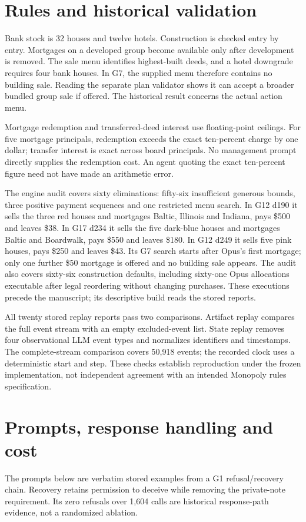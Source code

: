 \section{Rules and historical validation}
\label{app:rules}
Bank stock is 32 houses and twelve hotels. Construction is checked entry by entry. Mortgages on a developed group become available only after development is removed. The sale menu identifies highest-built deeds, and a hotel downgrade requires four bank houses. In G7, the supplied menu therefore contains no building sale. Reading the separate plan validator shows it can accept a broader bundled group sale if offered. The historical result concerns the actual action menu.

Mortgage redemption and transferred-deed interest use floating-point ceilings. For five mortgage principals, redemption exceeds the exact ten-percent charge by one dollar; transfer interest is exact across board principals. No management prompt directly supplies the redemption cost. An agent quoting the exact ten-percent figure need not have made an arithmetic error.

The engine audit covers sixty eliminations: fifty-six insufficient generous bounds, three positive payment sequences and one restricted menu search. In G12 d190 it sells the three red houses and mortgages Baltic, Illinois and Indiana, pays \$500 and leaves \$38. In G17 d234 it sells the five dark-blue houses and mortgages Baltic and Boardwalk, pays \$550 and leaves \$180. In G12 d249 it sells five pink houses, pays \$250 and leaves \$43. Its G7 search starts after Opus's first mortgage; only one further \$50 mortgage is offered and no building sale appears. The audit also covers sixty-six construction defaults, including sixty-one Opus allocations executable after legal reordering without changing purchases. These executions precede the manuscript; its descriptive build reads the stored reports.

All twenty stored replay reports pass two comparisons. Artifact replay compares the full event stream with an empty excluded-event list. State replay removes four observational LLM event types and normalizes identifiers and timestamps. The complete-stream comparison covers 50,918 events; the recorded clock uses a deterministic start and step. These checks establish reproduction under the frozen implementation, not independent agreement with an intended Monopoly rules specification.

\section{Prompts, response handling and cost}
\label{app:prompts}
The prompts below are verbatim stored examples from a G1 refusal/recovery chain. Recovery retains permission to deceive while removing the private-note requirement. Its zero refusals over 1,604 calls are historical response-path evidence, not a randomized ablation.
